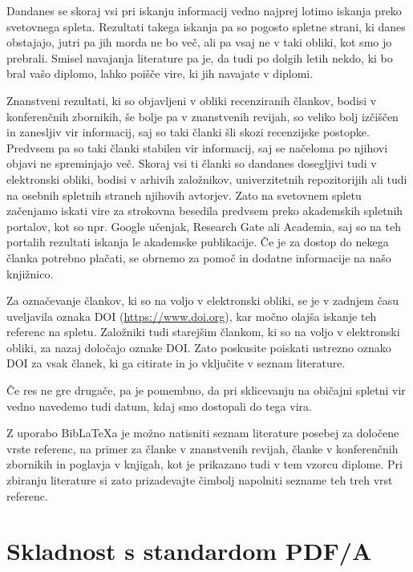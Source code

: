 \documentclass[a4paper,12pt,openright]{book}
\newcommand{\BibLaTeX}{{\sc Bib}\LaTeX}
\begin{document}
Dandanes  se skoraj  vsi pri iskanju informacij vedno najprej lotimo iskanja preko svetovnega spleta.
Rezultati takega iskanja pa so pogosto spletne strani, ki danes obstajajo, jutri pa jih morda ne bo več, ali pa vsaj ne v taki obliki, kot smo jo prebrali.
Smisel navajanja literature pa je, da tudi po dolgih letih nekdo, ki bo bral vašo diplomo, lahko poišče vire, ki jih navajate v diplomi.

Znanstveni rezultati, ki so objavljeni v obliki recenziranih člankov, bodisi v konferenčnih zbornikih, še bolje pa v znanstvenih revijah, so veliko bolj izčiščen in zanesljiv vir informacij, saj
so taki članki šli skozi recenzijske postopke. Predvsem pa so taki članki stabilen vir informacij, saj se načeloma po njihovi objavi ne spreminjajo več.
Skoraj vsi ti članki so dandanes dosegljivi tudi v elektronski obliki, bodisi v arhivih založnikov, univerzitetnih repozitorijih ali tudi na osebnih spletnih straneh njihovih avtorjev.
Zato na svetovnem spletu začenjamo iskati vire za strokovna besedila predvsem preko akademskih spletnih portalov, kot so npr. Google učenjak, Research Gate ali Academia, saj so na teh portalih rezultati iskanja le akademske publikacije.
Če je za dostop do nekega članka potrebno plačati, se obrnemo za pomoč in dodatne informacije na  našo knjižnico.

Za označevanje člankov, ki so na voljo v elektronski obliki, se je v zadnjem času uveljavila oznaka DOI
(\url{https://www.doi.org}), kar močno olajša iskanje teh referenc na spletu.
Založniki tudi starejšim člankom, ki so na voljo v elektronski obliki, za nazaj določajo oznake DOI.
Zato poskusite poiskati ustrezno oznako DOI za vsak članek, ki ga citirate in jo vključite v seznam literature.

Če res ne gre drugače, pa je pomembno, da pri sklicevanju na običajni spletni vir vedno navedemo tudi datum, kdaj smo dostopali do tega vira.

Z uporabo \BibLaTeX{a} je možno natisniti seznam literature posebej za določene vrste referenc, na primer za članke v znanstvenih revijah, članke v konferenčnih zbornikih in poglavja v knjigah, kot je prikazano tudi v tem vzorcu diplome. Pri zbiranju literature si zato prizadevajte čimbolj napolniti sezname teh treh vrst referenc.


\chapter{Skladnost s standardom PDF/A}
\label{PDF}
\end{document}
